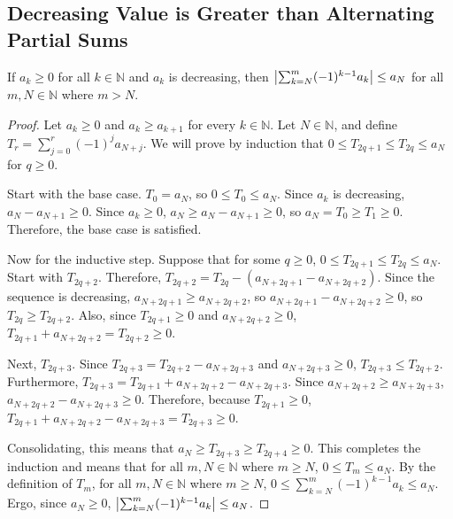 \documentclass[11pt]{article}
\begin{document}
    \subsection{Decreasing Value is Greater than Alternating Partial Sums}
        If $a_k \geq 0$ for all $k \in \mathbb{N}$ and $a_k$ is decreasing, then $\left| \sum_{k = N}^{m} (-1)^{k-1} a_k \right| \leq a_N$ for all $m,N \in \mathbb{N}$ where $m > N$.
        \begin{proof}
            Let \(a_k \geq 0\) and \(a_k \geq a_{k+1}\) for every \(k\in\mathbb N\).
            Let $N \in \mathbb{N}$, and define $T_r = \sum_{j=0}^{r} (-1)^j a_{N+j}$.
            We will prove by induction that $0 \leq T_{2q+1} \leq T_{2q} \leq a_N$ for $q \geq 0$.

            Start with the base case.
            $T_0 = a_N$, so $0 \leq T_0 \leq a_N$.
            Since $a_k$ is decreasing, $a_N - a_{N+1} \geq 0$.
            Since $a_k \geq 0$, $a_N \geq a_N - a_{N+1} \geq 0$, so $a_N = T_0 \geq T_1 \geq 0$.
            Therefore, the base case is satisfied.

            Now for the inductive step.
            Suppose that for some \(q \geq 0\), $0\leq T_{2q+1}\leq T_{2q}\leq a_N$.
            Start with $T_{2q+2}$.
            Therefore, $T_{2q+2}=T_{2q}-(a_{N+2q+1}-a_{N+2q+2})$.
            Since the sequence is decreasing, $a_{N+2q+1} \geq a_{N+2q+2}$, so $a_{N+2q+1} - a_{N+2q+2} \geq 0$, so $T_{2q} \geq T_{2q+2}$.
            Also, since $T_{2q+1} \geq 0$ and $a_{N+2q+2} \geq 0$, $T_{2q+1} + a_{N+2q+2} = T_{2q+2} \geq 0$.

            Next, $T_{2q+3}$.
            Since $T_{2q + 3} = T_{2q + 2} - a_{N + 2q + 3}$ and $a_{N + 2q + 3} \geq 0$, $T_{2q + 3} \leq T_{2q + 2}$.
            Furthermore, $T_{2q + 3} = T_{2q + 1} + a_{N + 2q + 2} - a_{N + 2q + 3}$.
            Since $a_{N + 2q + 2} \geq a_{N + 2q + 3}$, $a_{N + 2q + 2} - a_{N + 2q + 3} \geq 0$.
            Therefore, because $T_{2q + 1} \geq 0$, $T_{2q + 1} + a_{N + 2q + 2} - a_{N + 2q + 3} = T_{2q + 3} \geq 0$.

            Consolidating, this means that $a_N \geq T_{2q + 3} \geq T_{2q + 4} \geq 0$.
            This completes the induction and means that for all $m,N \in \mathbb{N}$ where $m \geq N$, $0 \leq T_m \leq a_N$.
            By the definition of $T_m$, for all $m,N \in \mathbb{N}$ where $m \geq N$, $0 \leq \sum_{k = N}^{m} (-1)^{k-1} a_k \leq a_N$.
            Ergo, since $a_N \geq 0$, $\left| \sum_{k = N}^{m} (-1)^{k-1} a_k \right| \leq a_N$.
        \end{proof}
\end{document}
